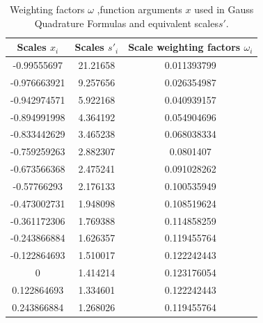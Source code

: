 \documentclass[3p,times,procedia,number]{elsarticle}
\begin{document}
\begin{table}[!h]
	\centering
	\caption{Weighting factors $\omega$ ,function arguments $x$  used in Gauss Quadrature Formulas and equivalent scales$s'$.}
	\label{Gauss}
	\begin{tabular}{ccc}
		\hline
		\textbf{Scales $x_i$} & \textbf{Scales $s'_i$} & \textbf{Scale weighting factors $\omega_i$} \\ \hline
		-0.99555697                      & 21.21658                 & 0.011393799                                   \\
		-0.976663921                     & 9.257656                 & 0.026354987                                   \\
		-0.942974571                     & 5.922168                 & 0.040939157                                   \\
		-0.894991998                     & 4.364192                 & 0.054904696                                   \\
		-0.833442629                     & 3.465238                 & 0.068038334                                   \\
		-0.759259263                     & 2.882307                 & 0.0801407                                     \\
		-0.673566368                     & 2.475241                 & 0.091028262                                   \\
		-0.57766293                      & 2.176133                 & 0.100535949                                   \\
		-0.473002731                     & 1.948098                 & 0.108519624                                   \\
		-0.361172306                     & 1.769388                 & 0.114858259                                   \\
		-0.243866884                     & 1.626357                 & 0.119455764                                   \\
		-0.122864693                     & 1.510017                 & 0.122242443                                   \\
		0                                & 1.414214                 & 0.123176054                                   \\
		0.122864693                      & 1.334601                 & 0.122242443                                   \\
		0.243866884                      & 1.268026                 & 0.119455764                                   \\

\end{tabular}
\end{table}
\end{document}
